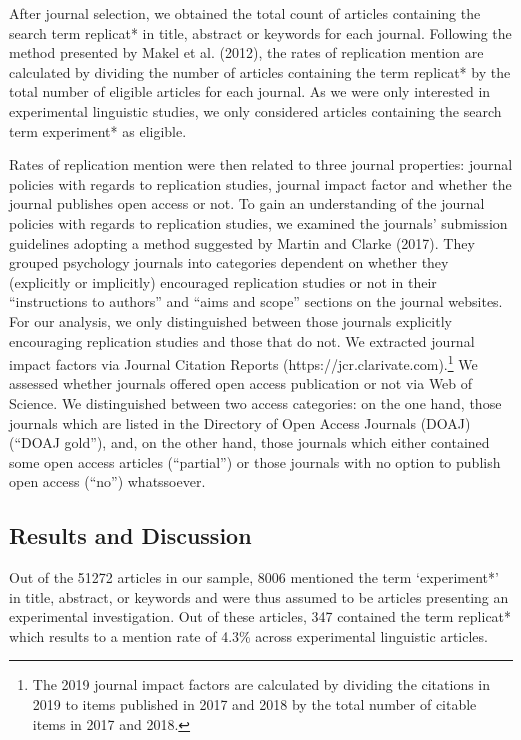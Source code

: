 \documentclass[]{elsarticle} %
\begin{document}
After journal selection, we obtained the total count of articles containing the search term replicat* in title, abstract or keywords for each journal.
Following the method presented by Makel et al. (2012), the rates of replication mention are calculated by dividing the number of articles containing the term replicat* by the total number of eligible articles for each journal. As we were only interested in experimental linguistic studies, we only considered articles containing the search term experiment* as eligible.

Rates of replication mention were then related to three journal properties: journal policies with regards to replication studies, journal impact factor and whether the journal publishes open access or not.
To gain an understanding of the journal policies with regards to replication studies, we examined the journals' submission guidelines adopting a method suggested by Martin and Clarke (2017).
They grouped psychology journals into categories dependent on whether they (explicitly or implicitly) encouraged replication studies or not in their ``instructions to authors'' and ``aims and scope'' sections on the journal websites. For our analysis, we only distinguished between those journals explicitly encouraging replication studies and those that do not.
We extracted journal impact factors via Journal Citation Reports (https://jcr.clarivate.com).\footnote{The 2019 journal impact factors are calculated by dividing the citations in 2019 to items published in 2017 and 2018 by the total number of citable items in 2017 and 2018.}
We assessed whether journals offered open access publication or not via Web of Science.
We distinguished between two access categories: on the one hand, those journals which are listed in the Directory of Open Access Journals (DOAJ) (``DOAJ gold''), and, on the other hand, those journals which either contained some open access articles (``partial'') or those journals with no option to publish open access (``no'') whatssoever.

\hypertarget{results-and-discussion}{%
\subsection{Results and Discussion}\label{results-and-discussion}}

Out of the 51272 articles in our sample, 8006 mentioned the term `experiment*' in title, abstract, or keywords and were thus assumed to be articles presenting an experimental investigation.
Out of these articles, 347 contained the term replicat* which results to a mention rate of 4.3\% across experimental linguistic articles.
\end{document}
